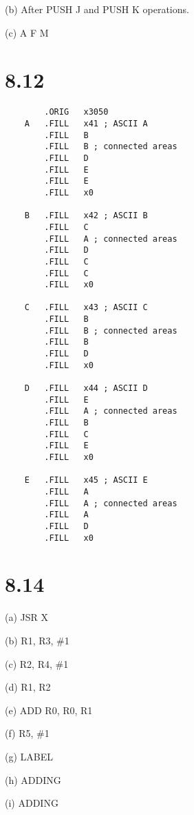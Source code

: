 \documentclass[20pt]{ctexart}
\begin{document}
(b) After PUSH J and PUSH K operations.

(c) A F M

\section*{8.12}
\begin{verbatim}
        .ORIG   x3050
    A   .FILL   x41 ; ASCII A
        .FILL   B
        .FILL   B ; connected areas
        .FILL   D
        .FILL   E
        .FILL   E
        .FILL   x0

    B   .FILL   x42 ; ASCII B
        .FILL   C
        .FILL   A ; connected areas
        .FILL   D
        .FILL   C
        .FILL   C
        .FILL   x0
        
    C   .FILL   x43 ; ASCII C
        .FILL   B
        .FILL   B ; connected areas
        .FILL   B
        .FILL   D
        .FILL   x0
        
    D   .FILL   x44 ; ASCII D
        .FILL   E
        .FILL   A ; connected areas
        .FILL   B
        .FILL   C
        .FILL   E
        .FILL   x0

    E   .FILL   x45 ; ASCII E
        .FILL   A
        .FILL   A ; connected areas
        .FILL   A
        .FILL   D
        .FILL   x0
\end{verbatim}

\section*{8.14}
(a) JSR X

(b) R1, R3, \#1

(c) R2, R4, \#1

(d) R1, R2

(e) ADD R0, R0, R1

(f) R5, \#1

(g) LABEL

(h) ADDING

(i) ADDING
\end{document}
